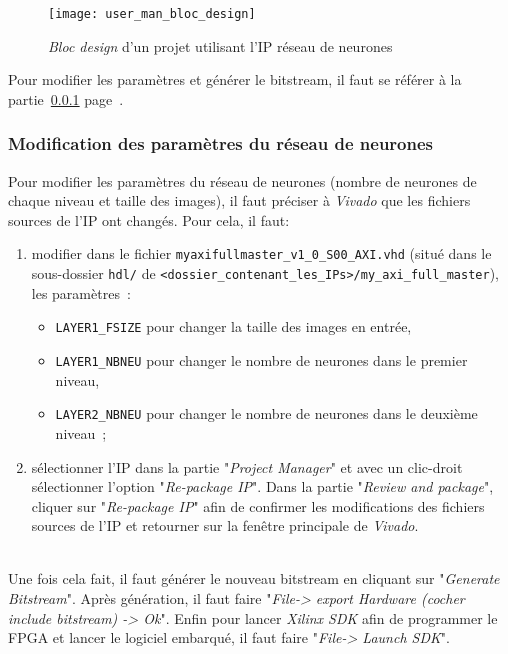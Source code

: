 \begin{figure}[h!]
	\texttt{[image: user\_man\_bloc\_design]}
	\caption{{\em Bloc design} d'un projet utilisant l'IP réseau de neurones}
	\label{fig:user_man_bloc_design}
\end{figure}

Pour modifier les paramètres et générer le bitstream, il faut se référer à la
partie~\ref{plan:user_man_modif_param}
page~\pageref{plan:user_man_modif_param}.


\subsubsection{Modification des paramètres du réseau de neurones}
\label{plan:user_man_modif_param}

Pour modifier les paramètres du réseau de neurones (nombre de neurones de chaque
niveau et taille des images), il faut préciser à {\em Vivado} que les fichiers sources
de l'IP ont changés. Pour cela, il faut:
\begin{enumerate}
	\item modifier dans le fichier \verb+myaxifullmaster_v1_0_S00_AXI.vhd+ (situé dans le sous-dossier \verb+hdl/+ de  \verb+<dossier_contenant_les_IPs>/my_axi_full_master+), les paramètres~:
		\begin{itemize}
			\item \verb+LAYER1_FSIZE+ pour changer la taille des images en entrée,
			\item \verb+LAYER1_NBNEU+ pour changer le nombre de neurones dans le premier niveau,
			\item \verb+LAYER2_NBNEU+ pour changer le nombre de neurones dans le deuxième niveau~;
		\end{itemize}
	\item sélectionner l'IP dans la partie "{\em Project Manager}"
		et avec un clic-droit sélectionner l'option "{\em Re-package IP}".
		Dans la partie "{\em Review and package}", cliquer sur "{\em Re-package IP}" afin de confirmer
		les modifications des fichiers sources de l'IP et retourner sur la fenêtre principale de {\em Vivado}.
\end{enumerate}
~\\
Une fois cela fait, il faut générer le nouveau bitstream en cliquant sur "{\em Generate Bitstream}".
Après génération, il faut faire "{\em File-> export Hardware (cocher include bitstream) -> Ok}".
Enfin pour lancer {\em Xilinx SDK} afin de programmer le FPGA et lancer le logiciel embarqué, il faut faire "{\em File-> Launch SDK}".


